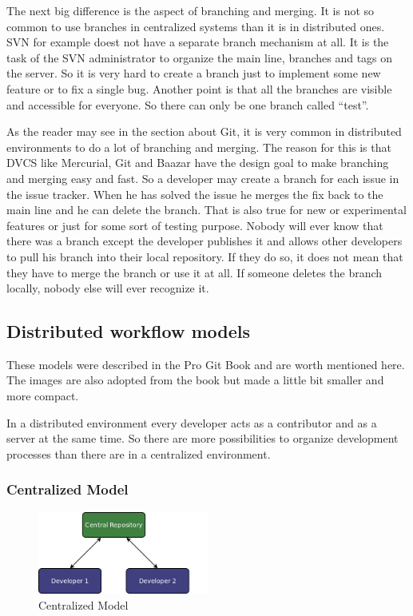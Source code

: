 The next big difference is the aspect of branching and merging. It is not so common to use branches 
in centralized systems than it is in distributed ones. SVN for example doest not have a separate branch 
mechanism at all. \cite[Apache\_Subversion\#Tag- und Branchkonzept]{wikipedia}
It is the task of the SVN administrator to organize the main line, branches and tags on the server. 
So it is very hard to create a branch just to implement some new feature or to fix a single bug. Another 
point is that all the branches are visible and accessible for everyone. So there can only 
be one branch called “test”.

As the reader may see in the section about Git, it is very common in distributed environments to 
do a lot of branching and merging. The reason for this is that DVCS like Mercurial, Git and Baazar 
have the design goal to make branching and merging easy and fast. So a developer may create a branch 
for each issue in the issue tracker. When he has solved the issue he merges the fix back to the main 
line and he can delete the branch. That is also true for new or experimental features or just for some sort 
of testing purpose. Nobody will ever know that there was a branch except the developer publishes 
it and allows other developers to pull his branch into their local repository. If they do so, it 
does not mean that they have to merge the branch or use it at all. If someone deletes
the branch locally, nobody else will ever recognize it.


\subsection{Distributed workflow models}

These models were described in the Pro Git Book \cite[chapter 5.1]{gitpro2009} and are 
worth mentioned here. The images are also adopted from the book but made a little bit smaller and more compact.

In a distributed environment every developer acts as a contributor and as a server at the same time. So there are more 
possibilities to organize development processes than there are in a centralized environment.


\subsubsection{Centralized Model}

\begin{figure}[ht]
  \centering
  \includegraphics[width=0.5\textwidth]{img/Mod_Central}
  \caption{Centralized Model}
  \label{fig:mod_centralized} 
\end{figure}

